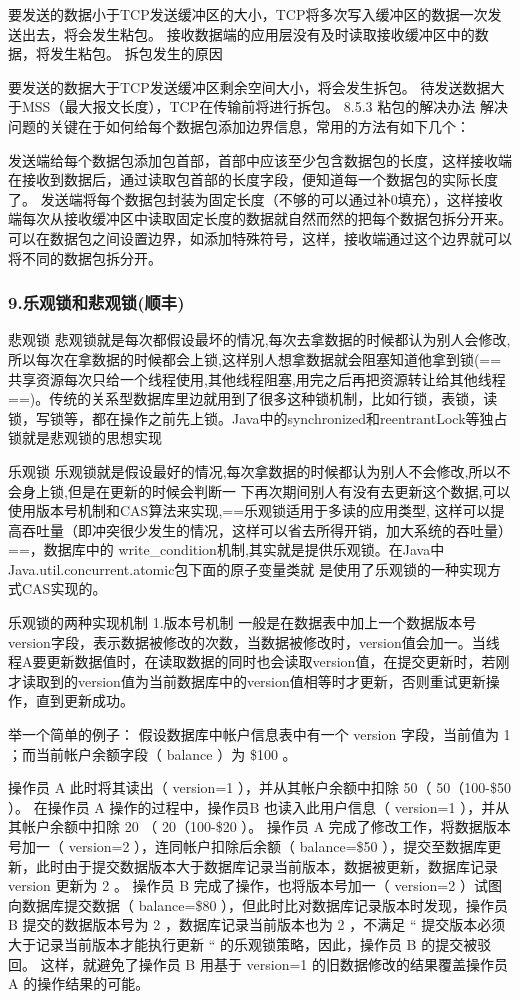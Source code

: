\documentclass[UTF8]{ctexart}
\begin{document}
要发送的数据小于TCP发送缓冲区的大小，TCP将多次写入缓冲区的数据一次发送出去，将会发生粘包。
接收数据端的应用层没有及时读取接收缓冲区中的数据，将发生粘包。
拆包发生的原因

要发送的数据大于TCP发送缓冲区剩余空间大小，将会发生拆包。
待发送数据大于MSS（最大报文长度），TCP在传输前将进行拆包。
8.5.3 粘包的解决办法
解决问题的关键在于如何给每个数据包添加边界信息，常用的方法有如下几个：

发送端给每个数据包添加包首部，首部中应该至少包含数据包的长度，这样接收端在接收到数据后，通过读取包首部的长度字段，便知道每一个数据包的实际长度了。
发送端将每个数据包封装为固定长度（不够的可以通过补0填充），这样接收端每次从接收缓冲区中读取固定长度的数据就自然而然的把每个数据包拆分开来。
可以在数据包之间设置边界，如添加特殊符号，这样，接收端通过这个边界就可以将不同的数据包拆分开。
\subsubsection{9.乐观锁和悲观锁(顺丰)}
悲观锁
悲观锁就是每次都假设最坏的情况,每次去拿数据的时候都认为别人会修改,所以每次在拿数据的时候都会上锁,这样别人想拿数据就会阻塞知道他拿到锁(==共享资源每次只给一个线程使用,其他线程阻塞,用完之后再把资源转让给其他线程==)。传统的关系型数据库里边就用到了很多这种锁机制，比如行锁，表锁，读锁，写锁等，都在操作之前先上锁。Java中的synchronized和reentrantLock等独占锁就是悲观锁的思想实现

乐观锁
乐观锁就是假设最好的情况,每次拿数据的时候都认为别人不会修改,所以不会身上锁,但是在更新的时候会判断一
下再次期间别人有没有去更新这个数据,可以使用版本号机制和CAS算法来实现,==乐观锁适用于多读的应用类型,
这样可以提高吞吐量（即冲突很少发生的情况，这样可以省去所得开销，加大系统的吞吐量）==，数据库中的
write\_condition机制,其实就是提供乐观锁。在Java中Java.util.concurrent.atomic包下面的原子变量类就
是使用了乐观锁的一种实现方式CAS实现的。

乐观锁的两种实现机制
1.版本号机制
一般是在数据表中加上一个数据版本号version字段，表示数据被修改的次数，当数据被修改时，version值会加一。当线程A要更新数据值时，在读取数据的同时也会读取version值，在提交更新时，若刚才读取到的version值为当前数据库中的version值相等时才更新，否则重试更新操作，直到更新成功。

举一个简单的例子： 假设数据库中帐户信息表中有一个 version 字段，当前值为 1 ；而当前帐户余额字段（ balance ）为 \$100 。

操作员 A 此时将其读出（ version=1 ），并从其帐户余额中扣除 50（ 50（100-\$50 ）。
在操作员 A 操作的过程中，操作员B 也读入此用户信息（ version=1 ），并从其帐户余额中扣除 20 （ 20（100-\$20 ）。
操作员 A 完成了修改工作，将数据版本号加一（ version=2 ），连同帐户扣除后余额（ balance=\$50 ），提交至数据库更新，此时由于提交数据版本大于数据库记录当前版本，数据被更新，数据库记录 version 更新为 2 。
操作员 B 完成了操作，也将版本号加一（ version=2 ）试图向数据库提交数据（ balance=\$80 ），但此时比对数据库记录版本时发现，操作员 B 提交的数据版本号为 2 ，数据库记录当前版本也为 2 ，不满足 “ 提交版本必须大于记录当前版本才能执行更新 “ 的乐观锁策略，因此，操作员 B 的提交被驳回。
这样，就避免了操作员 B 用基于 version=1 的旧数据修改的结果覆盖操作员A 的操作结果的可能。
\end{document}
